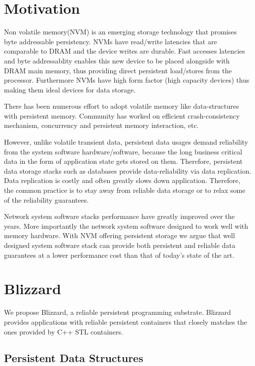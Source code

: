 \section{Motivation}
Non volatile memory(NVM) is an emerging storage technology that promises byte addressable 
persistency. NVMs have read/write latencies that are comparable to DRAM and the device 
writes are durable. Fast accesses latencies and byte addressablity enables this new device
to be placed alongside with DRAM main memory, thus providing direct persistent load/stores
from the processor. Furthermore NVMs have high form factor (high capacity devices) thus
making them ideal devices for data storage. 

There has been numerous effort to adopt volatile memory like data-structures with persistent
memory. Community has worked on efficient crash-consistency mechanism, concurrency and persistent
memory interaction, etc. 

However, unlike volatile transient data, persistent data usages
demand reliability from the system software hardware/software, because the long business critical data
in the form of application state gets stored on them. Therefore, persistent data storage stacks such
as databases provide data-reliability via data replication. Data replication is costly and often
greatly slows down application. Therefore, the common practice is to stay away from reliable data
storage or to relax some of the reliability guarantees.

Network system software stacks performance have greatly improved over the years. More importantly
the network system software designed to work well with memory hardware. With NVM offering persistent
storage we argue that well designed system software stack can provide both persistent and reliable
data guarantees at a lower performance cost than that of today's state of the art.

\section{Blizzard}
We propose Blizzard, a reliable persistent programming substrate. Blizzard provides applications
with reliable persistent containers that closely matches the ones provided by C++ STL containers.

\subsection{Persistent Data Structures}

